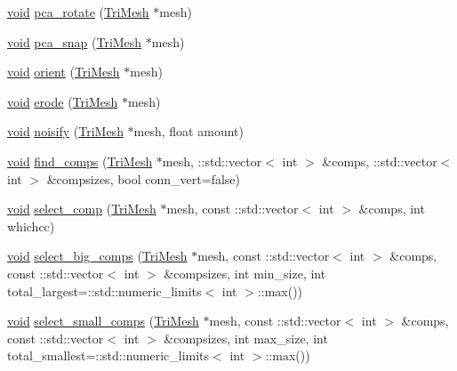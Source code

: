 \begin{DoxyCompactItemize}
\item 
\hyperlink{namespacetrimesh_a784ddfd979e1c579bda795a8edfc3f43}{void} \hyperlink{namespacetrimesh_a2a3669b47f05d87d8a8a13b80377f1a0}{pca\+\_\+rotate} (\hyperlink{classtrimesh_1_1TriMesh}{Tri\+Mesh} $\ast$mesh)
\item 
\hyperlink{namespacetrimesh_a784ddfd979e1c579bda795a8edfc3f43}{void} \hyperlink{namespacetrimesh_a6b6c8d067ad921e0219c16f7872b267a}{pca\+\_\+snap} (\hyperlink{classtrimesh_1_1TriMesh}{Tri\+Mesh} $\ast$mesh)
\item 
\hyperlink{namespacetrimesh_a784ddfd979e1c579bda795a8edfc3f43}{void} \hyperlink{namespacetrimesh_a4b96f265ec05951dc2447a641fbfcabf}{orient} (\hyperlink{classtrimesh_1_1TriMesh}{Tri\+Mesh} $\ast$mesh)
\item 
\hyperlink{namespacetrimesh_a784ddfd979e1c579bda795a8edfc3f43}{void} \hyperlink{namespacetrimesh_a8376ba0b1555d2d21aedd51e78b219fe}{erode} (\hyperlink{classtrimesh_1_1TriMesh}{Tri\+Mesh} $\ast$mesh)
\item 
\hyperlink{namespacetrimesh_a784ddfd979e1c579bda795a8edfc3f43}{void} \hyperlink{namespacetrimesh_ad8abaeef03cff4b8d2b79fdce2ae88b1}{noisify} (\hyperlink{classtrimesh_1_1TriMesh}{Tri\+Mesh} $\ast$mesh, float amount)
\item 
\hyperlink{namespacetrimesh_a784ddfd979e1c579bda795a8edfc3f43}{void} \hyperlink{namespacetrimesh_a12c73eb3c766d6aeb4848749e7d2284f}{find\+\_\+comps} (\hyperlink{classtrimesh_1_1TriMesh}{Tri\+Mesh} $\ast$mesh, \+::std\+::vector$<$ int $>$ \&comps, \+::std\+::vector$<$ int $>$ \&compsizes, bool conn\+\_\+vert=false)
\item 
\hyperlink{namespacetrimesh_a784ddfd979e1c579bda795a8edfc3f43}{void} \hyperlink{namespacetrimesh_ad5569b44306d1bd25b5964524a46e6be}{select\+\_\+comp} (\hyperlink{classtrimesh_1_1TriMesh}{Tri\+Mesh} $\ast$mesh, const \+::std\+::vector$<$ int $>$ \&comps, int whichcc)
\item 
\hyperlink{namespacetrimesh_a784ddfd979e1c579bda795a8edfc3f43}{void} \hyperlink{namespacetrimesh_a8224279c81a51548f945fc55a2b8f11f}{select\+\_\+big\+\_\+comps} (\hyperlink{classtrimesh_1_1TriMesh}{Tri\+Mesh} $\ast$mesh, const \+::std\+::vector$<$ int $>$ \&comps, const \+::std\+::vector$<$ int $>$ \&compsizes, int min\+\_\+size, int total\+\_\+largest=\+::std\+::numeric\+\_\+limits$<$ int $>$\+::max())
\item 
\hyperlink{namespacetrimesh_a784ddfd979e1c579bda795a8edfc3f43}{void} \hyperlink{namespacetrimesh_a2ce21b5b98ba2c6875d4c4506b344e91}{select\+\_\+small\+\_\+comps} (\hyperlink{classtrimesh_1_1TriMesh}{Tri\+Mesh} $\ast$mesh, const \+::std\+::vector$<$ int $>$ \&comps, const \+::std\+::vector$<$ int $>$ \&compsizes, int max\+\_\+size, int total\+\_\+smallest=\+::std\+::numeric\+\_\+limits$<$ int $>$\+::max())

\end{DoxyCompactItemize}
